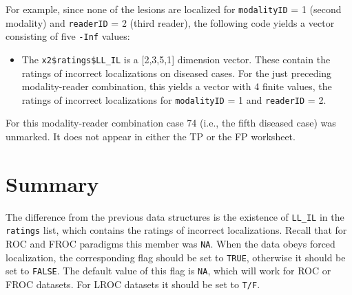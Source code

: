 \documentclass[
]{book}
\newenvironment{Shaded}{\begin{snugshade}}{\end{snugshade}}
\newcommand{\CommentTok}[1]{\textcolor[rgb]{0.56,0.35,0.01}{\textit{#1}}}
\newcommand{\DecValTok}[1]{\textcolor[rgb]{0.00,0.00,0.81}{#1}}
\newcommand{\NormalTok}[1]{#1}
\newcommand{\SpecialCharTok}[1]{\textcolor[rgb]{0.00,0.00,0.00}{#1}}
\providecommand{\tightlist}{%
  \setlength{\itemsep}{0pt}\setlength{\parskip}{0pt}}
\begin{document}
For example, since none of the lesions are localized for \texttt{modalityID} = 1 (second modality) and \texttt{readerID} = 2 (third reader), the following code yields a vector consisting of five \texttt{-Inf} values:

\begin{Shaded}
\end{Shaded}

\begin{itemize}
\tightlist
\item
  The \texttt{x2\$ratings\$LL\_IL} is a {[}2,3,5,1{]} dimension vector. These contain the ratings of incorrect localizations on diseased cases. For the just preceding modality-reader combination, this yields a vector with 4 finite values, the ratings of incorrect localizations for \texttt{modalityID} = 1 and \texttt{readerID} = 2.
\end{itemize}

\begin{Shaded}
\end{Shaded}

For this modality-reader combination case 74 (i.e., the fifth diseased case) was unmarked. It does not appear in either the TP or the FP worksheet.

\hypertarget{quick-start-lroc-data-summary}{%
\section{Summary}\label{quick-start-lroc-data-summary}}

The difference from the previous data structures is the existence of \texttt{LL\_IL} in the \texttt{ratings} list, which contains the ratings of incorrect localizations. Recall that for ROC and FROC paradigms this member was \texttt{NA}. When the data obeys forced localization, the corresponding flag should be set to \texttt{TRUE}, otherwise it should be set to \texttt{FALSE}. The default value of this flag is \texttt{NA}, which will work for ROC or FROC datasets. For LROC datasets it should be set to \texttt{T/F}.
\end{document}
